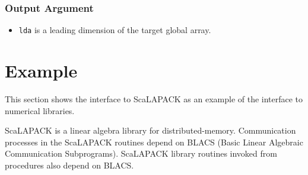 \subsubsection*{Output Argument}
\begin{itemize}
 \item {\tt lda} is a leading dimension of the target global array.
\end{itemize}


\section{Example}

   This section shows the interface to ScaLAPACK as an example of the
   {\XMP} interface to numerical libraries.
   
   ScaLAPACK is a linear algebra library for distributed-memory.
   Communication processes in the ScaLAPACK routines depend on BLACS
   (Basic Linear Algebraic Communication Subprograms).
   ScaLAPACK library routines invoked from {\XMP} procedures also depend
   on BLACS. %



